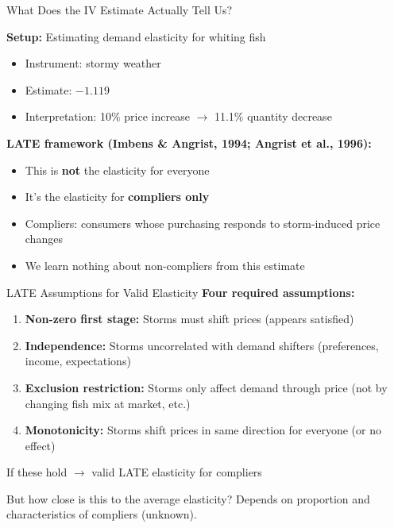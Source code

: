\documentclass{beamer}
\begin{document}
\begin{frame}{What Does the IV Estimate Actually Tell Us?}

\textbf{Setup:} Estimating demand elasticity for whiting fish
\begin{itemize}
    \item Instrument: stormy weather
    \item Estimate: $-1.119$
    \item Interpretation: 10\% price increase $\rightarrow$ 11.1\% quantity decrease
\end{itemize}
\vspace{0.5cm}
\pause
\textbf{LATE framework (Imbens \& Angrist, 1994; Angrist et al., 1996):}
\begin{itemize}
    \item This is \textbf{not} the elasticity for everyone
    \item It's the elasticity for \textbf{compliers only}
    \item Compliers: consumers whose purchasing responds to storm-induced price changes
    \item We learn nothing about non-compliers from this estimate
\end{itemize}
\end{frame}

\begin{frame}{LATE Assumptions for Valid Elasticity}
\textbf{Four required assumptions:}
\vspace{0.3cm}

\begin{enumerate}
    \item \textbf{Non-zero first stage:} Storms must shift prices (appears satisfied)
    \vspace{0.2cm}
    \item \textbf{Independence:} Storms uncorrelated with demand shifters (preferences, income, expectations)
    \vspace{0.2cm}
    \item \textbf{Exclusion restriction:} Storms only affect demand through price (not by changing fish mix at market, etc.)
    \vspace{0.2cm}
    \item \textbf{Monotonicity:} Storms shift prices in same direction for everyone (or no effect)
\end{enumerate}
\vspace{0.3cm}
\pause
If these hold $\rightarrow$ valid LATE elasticity for compliers

But how close is this to the average elasticity? Depends on proportion and characteristics of compliers (unknown).
\end{frame}
\end{document}
